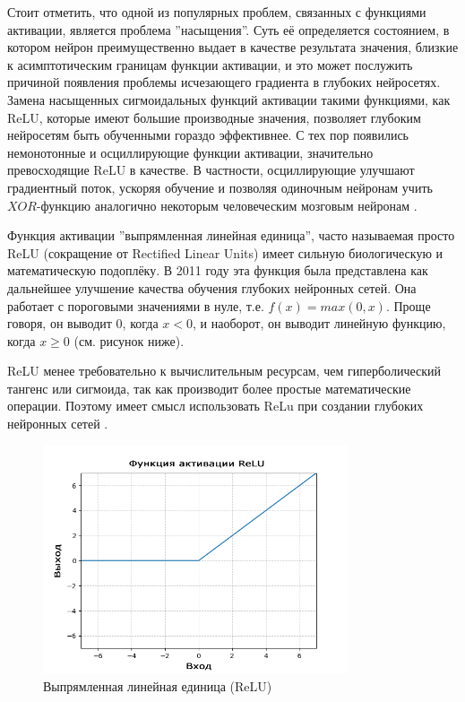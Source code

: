 \documentclass[bachelor, och, coursework]{SCWorks}
\begin{document}
        Стоит отметить, что одной из популярных проблем, связанных с функциями
        активации, является проблема ''насыщения''. Суть её определяется
        состоянием, в котором нейрон преимущественно выдает в качестве
        результата значения, близкие к асимптотическим границам функции
        активации, и это может послужить причиной появления проблемы исчезающего
        градиента в глубоких нейросетях. Замена насыщенных сигмоидальных функций
        активации такими функциями, как ReLU, которые имеют большие
        производные значения, позволяет глубоким нейросетям быть обученными
        гораздо эффективнее. С тех пор появились немонотонные и осциллирующие
        функции активации, значительно превосходящие ReLU в качестве. В
        частности, осциллирующие улучшают градиентный поток, ускоряя обучение и
        позволяя одиночным нейронам учить $XOR$-функцию аналогично некоторым
        человеческим мозговым нейронам \cite{relu2}.

        Функция активации ''выпрямленная линейная единица'', часто называемая
        просто ReLU (сокращение от Rectified Linear Units) имеет сильную
        биологическую и математическую подоплёку. В 2011 году эта функция была
        представлена как дальнейшее улучшение качества обучения глубоких
        нейронных сетей. Она работает с пороговыми значениями в нуле, т.е. $f(x)
        = max(0, x)$. Проще говоря, он выводит $0$, когда $x < 0$, и наоборот,
        он выводит линейную функцию, когда $x \geq 0$ (см. рисунок ниже).

        ReLU менее требовательно к вычислительным ресурсам, чем гиперболический
        тангенс или сигмоида, так как производит более простые математические
        операции. Поэтому имеет смысл использовать ReLu при создании глубоких
        нейронных сетей \cite{relu1}.

        \begin{figure}[H]
            \centering
            \includegraphics[width=0.8\textwidth]{pics/ReLU.png}
            \caption{Выпрямленная линейная единица (ReLU)}
        \end{figure}
\end{document}
